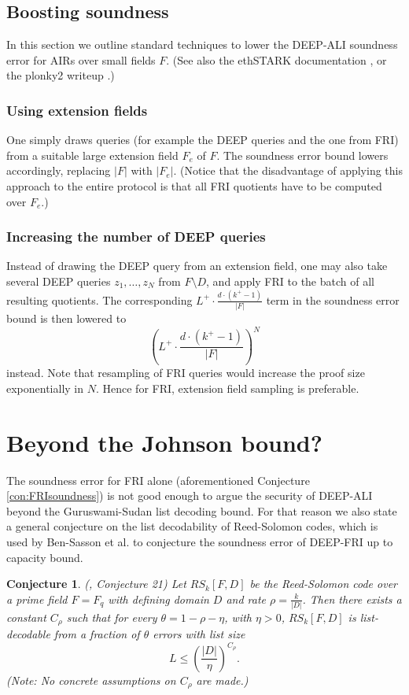 \documentclass[11pt,article,oneside]{memoir}
\newtheorem{conj}[]{Conjecture}
\theoremstyle{definition}
\theoremstyle{remark}
\begin{document}
\subsection{Boosting soundness}
In this section we outline standard techniques to lower the DEEP-ALI soundness error for AIRs over small fields $F$. 
(See also the ethSTARK documentation \cite{ethSTARK}, or the plonky2 writeup \cite{PolygonZero}.)

\subsubsection{Using extension fields}
One simply draws queries (for example the DEEP queries and the one from FRI) from a suitable large extension field $F_e$ of $F$.
The soundness error bound lowers accordingly, replacing $|F|$ with $|F_e|$. 
(Notice that the disadvantage of applying this approach to the entire protocol is that all FRI quotients have to be computed over $F_e$.)
 
\subsubsection{Increasing the number of DEEP queries}
Instead of drawing the DEEP query from an extension field, one may also take several DEEP queries $z_1,\ldots , z_N$ from $F\setminus D$, and apply FRI to the batch of all resulting quotients. 
The corresponding $L^+\cdot\frac{d\cdot (k^+-1)}{|F|}$ term in the soundness error bound is then lowered to  
\[
\left(L^+\cdot\frac{d\cdot (k^+ - 1)}{|F|}\right)^N
\]
instead. 
Note that resampling of FRI queries would increase the proof size exponentially in $N$. 
Hence for  FRI, extension field sampling is preferable.  

\section{Beyond the Johnson bound?}
\label{s:RSConjecture}

The soundness error for FRI alone (aforementioned Conjecture \ref{con:FRIsoundness}) is not good enough to argue the security of DEEP-ALI beyond the Guruswami-Sudan list decoding bound. 
For that reason we also state a general conjecture on the list decodability of Reed-Solomon codes, which is used by Ben-Sasson et al. to conjecture the soundness error of DEEP-FRI up to capacity bound. 

\begin{conj}
(\cite{DEEPFRI}, Conjecture 21) 
Let $RS_k[F,D]$ be the Reed-Solomon code over a prime field $F=F_q$ with defining domain $D$ and rate $\rho=\frac{k}{|D|}$. 
Then there exists a constant $C_\rho$  such that for every $\theta =1-\rho -\eta$, with $\eta>0$, $RS_k[F,D]$ is list-decodable from a fraction of $\theta$ errors with list size
\[
L \leq\left(\frac{|D|}{\eta}\right)^{C_\rho}.
\]
(Note: No concrete assumptions on $C_\rho$ are made.)
\end{conj}
\end{document}
